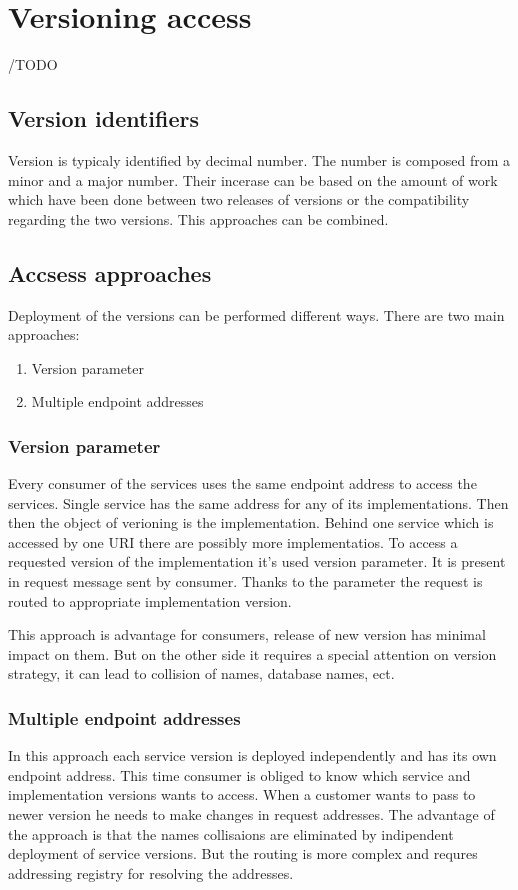 \chapter{Versioning access}
\label{chap:versionaccess}

/TODO


\section{Version identifiers}
Version is typicaly identified by decimal number. The number is composed from a minor and a major number. Their incerase can be based on the amount of work which have been done between two releases of versions or the compatibility regarding the two versions. This approaches can be combined.

\section{Accsess approaches}
Deployment of the versions can be performed different ways. There are two main approaches:
\begin{enumerate}
  \item Version parameter
  \item Multiple endpoint addresses
\end{enumerate}

\subsection{Version parameter}
Every consumer of the services uses the same endpoint address to access the services. Single service has the same address for any of its implementations. Then then the object of verioning is the implementation. Behind one service which is accessed by one URI there are possibly more implementatios.
To access a requested version of the implementation it's used version parameter. It is present in request message sent by consumer. Thanks to the parameter the request is routed to appropriate implementation version.

This approach is advantage for consumers, release of new version has minimal impact on them. But on the other side it requires a special attention on version strategy, it can lead to collision of names, database names, ect.

\subsection{Multiple endpoint addresses}
In this approach each service version is deployed independently and has its own endpoint address. This time consumer is obliged to know which service and implementation versions wants to access. When a customer wants to pass to newer version he needs to make changes in request addresses. The advantage of the approach is that the names collisaions are eliminated by indipendent deployment of service versions. But the routing is more complex and requres addressing registry for resolving the addresses.

